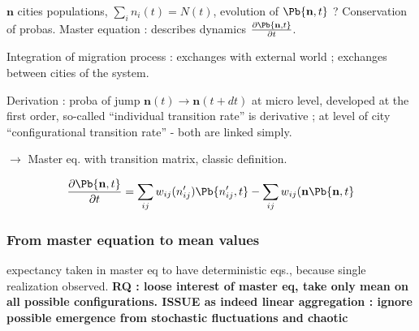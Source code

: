 $\mathbf{n}$ cities populations, $\sum_i n_i (t) = N(t)$, evolution of $\Pb{\mathbf{n},t}$ ? Conservation of probas. Master equation : describes dynamics $\frac{\partial \Pb{\mathbf{n},t}}{\partial t}$.

Integration of migration process : exchanges with external world ; exchanges between cities of the system.

Derivation : proba of jump $\mathbf{n}(t) \rightarrow \mathbf{n}(t + dt)$ at micro level, developed at the first order, so-called ``individual transition rate'' is derivative ; at level of city ``configurational transition rate'' - both are linked simply.

$\rightarrow$ Master eq. with transition matrix, classic definition.

\[
\frac{\partial \Pb{\mathbf{n},t}}{\partial t} = \sum_{ij}{w_{ij}(n'_{ij}) \Pb{n'_{ij},t}} - \sum_{ij}{w_{ij}(\mathbf{n}\Pb{\mathbf{n},t}}
\]


\subsubsection{From master equation to mean values}


expectancy taken in master eq to have deterministic eqs., because single realization observed. \textbf{RQ : loose interest of master eq, take only mean on all possible configurations. ISSUE as indeed linear aggregation : ignore possible emergence from stochastic fluctuations and chaotic }
















